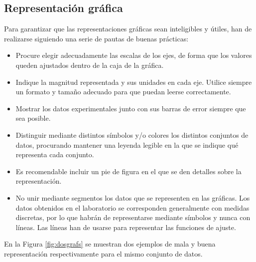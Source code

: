 \documentclass{book}
\begin{document}
\subsection{Representación gráfica}
Para garantizar que las representaciones gráficas sean inteligibles y útiles, han de realizarse 
siguiendo una serie de pautas de buenas prácticas:

\begin{itemize}
  \item Procure elegir adecuadamente las escalas de los ejes, de forma que los valores queden
  ajustados dentro de la caja de la gráfica.
  \item Indique la magnitud representada y sus unidades en cada eje. Utilice siempre un formato y
  tamaño adecuado para que puedan leerse correctamente.
  \item Mostrar los datos experimentales junto con sus barras de error siempre que sea posible.
  \item Distinguir mediante distintos símbolos y/o colores los distintos conjuntos de datos,
  procurando mantener una leyenda legible en la que se indique qué representa cada conjunto.
  \item Es recomendable incluir un pie de figura en el que se den detalles sobre la representación.
  \item No unir mediante segmentos los datos que se representen en las gráficas. Los datos obtenidos
  en el laboratorio se corresponden generalmente con medidas discretas, por lo que habrán de representarse
  mediante símbolos y nunca con líneas. Las líneas han de usarse para representar las funciones de
  ajuste.
\end{itemize}

En la Figura \ref{fig:dosgrafs} se muestran dos ejemplos de mala y buena representación 
respectivamente para el mismo conjunto de datos.
\end{document}
